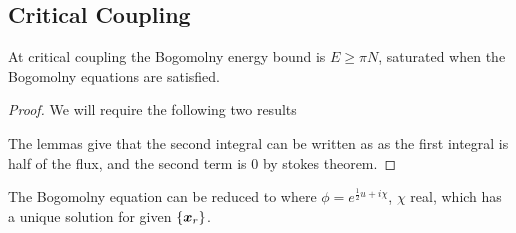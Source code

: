 \documentclass{article}
\begin{document}
\subsection{Critical Coupling}

\begin{prop}
At critical coupling the Bogomolny energy bound is $E \geq \pi N$, saturated when the Bogomolny equations
are satisfied.
\end{prop}
\begin{proof}
We will require the following two results 
\begin{lemma}
\end{lemma}
\begin{lemma}
\end{lemma}
The lemmas give that the second integral can be written as 
as the first integral is half of the flux, and the second term is 0 by stokes theorem. 
\end{proof}

\begin{theorem}
The Bogomolny equation can be reduced to 
where $\phi = e^{\frac{1}{2}u + i \chi}$, $\chi$ real, which has a unique solution for given $\left\{ \bm{x}_r \right\}$. 
\end{theorem}
\end{document}
